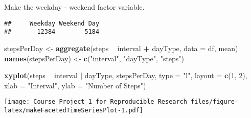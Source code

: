 \documentclass[]{article}
\newenvironment{Shaded}{\begin{snugshade}}{\end{snugshade}}
\newcommand{\KeywordTok}[1]{\textcolor[rgb]{0.13,0.29,0.53}{\textbf{#1}}}
\newcommand{\DataTypeTok}[1]{\textcolor[rgb]{0.13,0.29,0.53}{#1}}
\newcommand{\DecValTok}[1]{\textcolor[rgb]{0.00,0.00,0.81}{#1}}
\newcommand{\StringTok}[1]{\textcolor[rgb]{0.31,0.60,0.02}{#1}}
\newcommand{\OperatorTok}[1]{\textcolor[rgb]{0.81,0.36,0.00}{\textbf{#1}}}
\newcommand{\NormalTok}[1]{#1}
\begin{document}
Make the weekday - weekend factor variable.

\begin{Shaded}
\end{Shaded}

\begin{verbatim}
##     Weekday Weekend Day 
##       12384        5184
\end{verbatim}

\begin{Shaded}
\begin{Highlighting}[]
\NormalTok{stepsPerDay <-}\StringTok{ }\KeywordTok{aggregate}\NormalTok{(steps }\OperatorTok{~}\StringTok{ }\NormalTok{interval }\OperatorTok{+}\StringTok{ }\NormalTok{dayType, }\DataTypeTok{data =}\NormalTok{ df, mean)}
\KeywordTok{names}\NormalTok{(stepsPerDay) <-}\StringTok{ }\KeywordTok{c}\NormalTok{(}\StringTok{"interval"}\NormalTok{, }\StringTok{"dayType"}\NormalTok{, }\StringTok{"steps"}\NormalTok{)}
\end{Highlighting}
\end{Shaded}

\begin{Shaded}
\begin{Highlighting}[]
\KeywordTok{xyplot}\NormalTok{(steps }\OperatorTok{~}\StringTok{ }\NormalTok{interval }\OperatorTok{|}\StringTok{ }\NormalTok{dayType, stepsPerDay, }\DataTypeTok{type =} \StringTok{"l"}\NormalTok{, }\DataTypeTok{layout =} \KeywordTok{c}\NormalTok{(}\DecValTok{1}\NormalTok{, }\DecValTok{2}\NormalTok{), }
    \DataTypeTok{xlab =} \StringTok{"Interval"}\NormalTok{, }\DataTypeTok{ylab =} \StringTok{"Number of Steps"}\NormalTok{)}
\end{Highlighting}
\end{Shaded}

\texttt{[image: Course\_Project\_1\_for\_Reproducible\_Research\_files/figure-latex/makeFacetedTimeSeriesPlot-1.pdf]}
\end{document}
